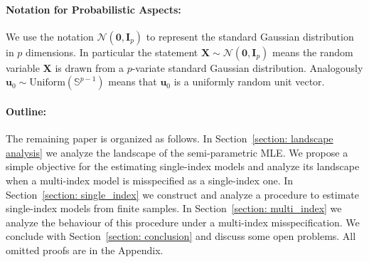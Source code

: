 \documentclass[final,12pt]{colt2018} %
\newcommand{\unitsphere}[1]{\mathbb{S}^{#1}}
\newcommand{\gauss}[2]{\mathcal{N}\left( #1,#2 \right)}
\renewcommand\v[1]{{\ensuremath{\boldsymbol{#1}}}}
\begin{document}
\paragraph{Notation for Probabilistic Aspects:} We use the notation $\gauss{\v 0}{\v I_p}$ to represent the standard Gaussian distribution in $p$ dimensions. In particular the statement $\v X \sim \gauss{\v 0}{\v I_p}$ means the random variable $\v X$ is drawn from a $p$-variate standard Gaussian distribution. Analogously $\v u_0 \sim \text{Uniform}(\unitsphere{p-1})$ means that $\v u_0$ is a uniformly random unit vector. 

\paragraph{Outline:} The remaining paper is organized as follows. In Section~\ref{section: landscape analysis} we analyze the landscape of the semi-parametric MLE. We propose a simple objective for the estimating single-index models and analyze its landscape when a multi-index model is misspecified as a single-index one. In Section~\ref{section: single_index} we construct and analyze a procedure to estimate single-index models from finite samples. In Section~\ref{section: multi_index} we analyze the behaviour of this procedure under a multi-index misspecification. We conclude with Section~\ref{section: conclusion} and discuss some open problems. All omitted proofs are in the Appendix. 
\end{document}
